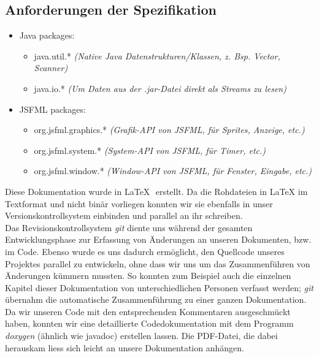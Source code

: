 \documentclass[12pt,a4paper]{scrartcl}
\begin{document}
\subsection{Anforderungen der Spezifikation} 
\begin{itemize}
\item Java packages: \begin{itemize}
	\item java.util.* \textit{(Native Java Datenstrukturen/Klassen, z. Bsp. Vector, Scanner)}
	\item java.io.* \textit{(Um Daten aus der .jar-Datei direkt als Streams zu lesen)}
\end{itemize}
\item JSFML packages: \begin{itemize}
	\item org.jsfml.graphics.* \textit{(Grafik-API von JSFML, für Sprites, Anzeige, etc.)}
	\item org.jsfml.system.* \textit{(System-API von JSFML, für Timer, etc.)}
	\item org.jsfml.window.* \textit{(Window-API von JSFML, für Fenster, Eingabe, etc.)}
\end{itemize}
\end{itemize}

Diese Dokumentation wurde in \LaTeX \,\, erstellt. Da die Rohdateien in LaTeX im Textformat und nicht
binär vorliegen konnten wir sie ebenfalls in unser Versionskontrollsystem einbinden und parallel
an ihr schreiben.\\

Das Revisionskontrollsystem \textit{git} diente uns während der gesamten Entwicklungsphase
zur Erfassung von Änderungen an unseren Dokumenten, bzw. im Code. Ebenso wurde es uns dadurch
ermöglicht, den Quellcode unseres Projektes parallel zu entwickeln, ohne dass wir uns
um das Zusammenführen von Änderungen kümmern mussten. So konnten zum Beispiel auch
die einzelnen Kapitel dieser Dokumentation von unterschiedlichen Personen verfasst werden;
\textit{git} übernahm die automatische Zusammenführung zu einer ganzen Dokumentation.\\

Da wir unseren Code mit den entsprechenden Kommentaren ausgeschmückt haben,
konnten wir eine detaillierte Codedokumentation mit dem Programm \textit{doxygen} (ähnlich wie javadoc) erstellen lassen.
Die PDF-Datei, die dabei herauskam liess sich leicht an unsere Dokumentation anhängen.\\
\end{document}
